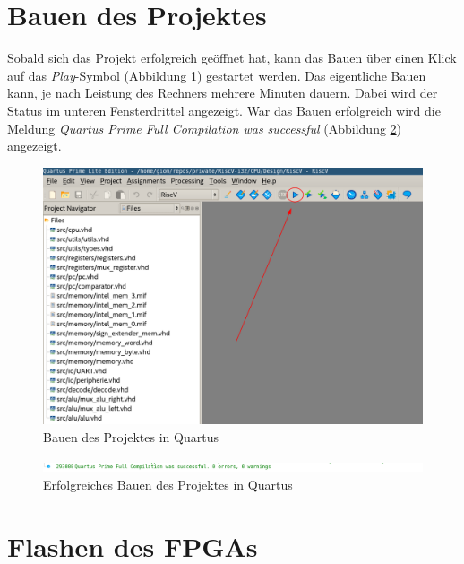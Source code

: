     \section{Bauen des Projektes}
        Sobald sich das Projekt erfolgreich geöffnet hat, kann das Bauen über einen Klick
        auf das \textit{Play}-Symbol (Abbildung \ref{fig:quartus_play}) gestartet werden. Das eigentliche Bauen kann, je nach
        Leistung des Rechners mehrere Minuten dauern. Dabei wird der Status im unteren
        Fensterdrittel angezeigt. War das Bauen erfolgreich wird die Meldung
        \textit{Quartus Prime Full Compilation was successful} (Abbildung \ref{fig:quartus_build_sucessful})
        angezeigt.

        \begin{figure}[H]
            \centering
            \includegraphics[scale=0.6]{img/quartus_build.png}
            \caption{Bauen des Projektes in Quartus}
            \label{fig:quartus_play}
        \end{figure}

        \begin{figure}[H]
            \centering
            \includegraphics[scale=0.6]{img/quartus_build_sucessfull.png}
            \caption{Erfolgreiches Bauen des Projektes in Quartus}
            \label{fig:quartus_build_sucessful}
        \end{figure}


    \section{Flashen des FPGAs}

